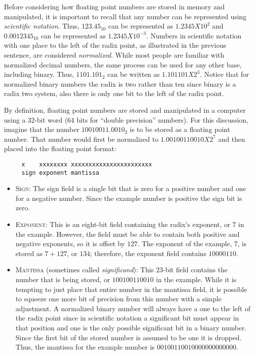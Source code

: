 Before considering how floating point numbers are stored in memory and manipulated, it is important to recall that any number can be represented using \emph{scientific notation}. Thus, $ 123.45_{10} $ can be represented as $ 1.2345 X 10^2 $ and $ 0.0012345_{10} $ can be represented as $ 1.2345 X 10^{-3} $. Numbers in scientific notation with one place to the left of the radix point, as illustrated in the previous sentence, are considered \emph{normalized}. While most people are familiar with normalized decimal numbers, the same process can be used for any other base, including binary. Thus, $ 1101.101_2 $ can be written as $ 1.101101 X 2^3 $. Notice that for normalized binary numbers the radix is two rather than ten since binary is a radix two system, also there is only one bit to the left of the radix point.

 By definition, floating point numbers are stored and manipulated in a computer using a 32-bit word (64 bits for ``double precision'' numbers). For this discussion, imagine that the number $ 10010011.0010_2 $ is to be stored as a floating point number. That number would first be normalized to $ 1.00100110010 X 2^7 $ and then placed into the floating point format:

\begin{verbatim}
     x    xxxxxxxx xxxxxxxxxxxxxxxxxxxxxxx
     sign exponent mantissa
\end{verbatim}

\begin{itemize}
  \item \textsc{Sign}: The sign field is a single bit that is zero for a positive number and one for a negative number. Since the example number is positive the sign bit is zero.

  \item \textsc{Exponent}: This is an eight-bit field containing the radix’s exponent, or $ 7 $ in the example. However, the field must be able to contain both positive and negative exponents, so it is offset by $ 127 $. The exponent of the example, $ 7 $, is stored as $ 7 + 127 $, or $ 134 $; therefore, the exponent field contains $ 10000110 $. 

  \item \textsc{Mantissa} (sometimes called \emph{significand}): This 23-bit field contains the number that is being stored, or $ 100100110010 $ in the example. While it is tempting to just place that entire number in the mantissa field, it is possible to squeeze one more bit of precision from this number with a simple adjustment. A normalized binary number will always have a one to the left of the radix point since in scientific notation a significant bit must appear in that position and one is the only possible significant bit in a binary number. Since the first bit of the stored number is assumed to be one it is dropped. Thus, the mantissa for the example number is $ 00100110010000000000000 $.

\end{itemize}

